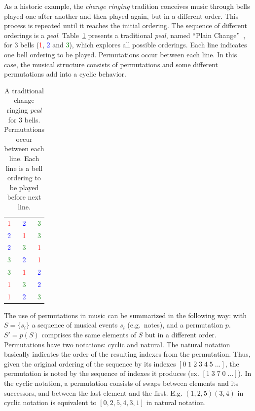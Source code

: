 As a historic
example, the \emph{change ringing} tradition conceives music through
bells played one after another and then played again, but in a different
order. This process is repeated until it reaches the initial ordering. The sequence of
different orderings is a \emph{peal}. Table~\ref{tab:change}
presents a traditional \emph{peal}, named ``Plain Change''~\cite{change}, for 3 bells (\textcolor{red}{1}, \textcolor{blue}{2} and \textcolor{green}{3}), which explores
all possible orderings. Each line indicates one bell ordering to be
played. Permutations occur between each line. In this case, the musical structure
consists of permutations and some different permutations add into a
cyclic behavior.

\begin{table}[htp!]
\centering
\caption{A traditional change ringing \emph{peal} for 3 bells. Permutations
occur between each line. Each line is a bell ordering to be played before next line.} 
\begin{tabular}{l c r}
\textcolor{red}{1} & \textcolor{blue}{2} & \textcolor{green}{3} \\
\textcolor{blue}{2} & \textcolor{red}{1} & \textcolor{green}{3} \\
\textcolor{blue}{2} & \textcolor{green}{3} & \textcolor{red}{1} \\
\textcolor{green}{3} & \textcolor{blue}{2} & \textcolor{red}{1} \\
\textcolor{green}{3} & \textcolor{red}{1} & \textcolor{blue}{2} \\
\textcolor{red}{1} & \textcolor{green}{3} & \textcolor{blue}{2} \\
\textcolor{red}{1} & \textcolor{blue}{2} & \textcolor{green}{3}
\end{tabular}
\label{tab:change}
\end{table}

The use of permutations in music can be summarized in the following way:
with $S=\{s_i\}$ a sequence of musical events $s_i$ (e.g.\ notes), and a
permutation $p$. $S'=p(S)$ comprises the same elements of $S$ but in a
different order. Permutations have two notations: cyclic and
natural. The natural notation basically indicates the order of the resulting indexes from
the permutation. Thus, given the original ordering of the sequence by its indexes $[0\;1\;2\;3\;4\;5\;...]$, the permutation is noted by the sequence of indexes it
produces (ex. $[1\;3\;7\;0\;...]$). In the cyclic notation, a permutation consists
of swaps between elements and its successors, and between the last element and the first.
E.g. $(1,2,5)(3,4)$ in cyclic notation is equivalent to $[0,2,5,4,3,1]$ in natural notation.

